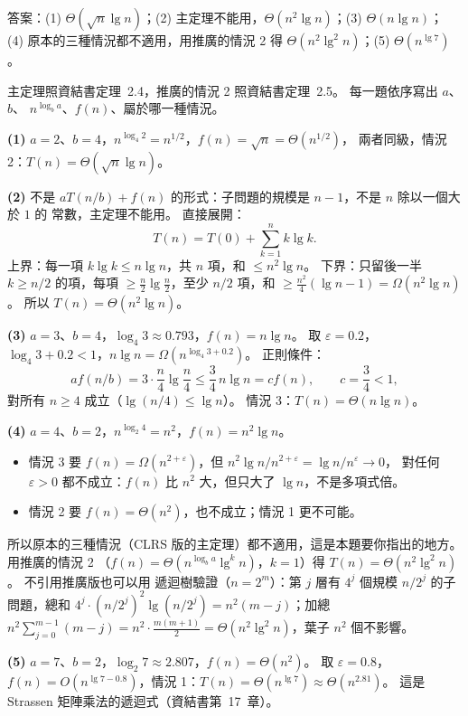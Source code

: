 \begin{pastsoln}
答案：(1) $\Theta(\sqrt{n} \lg n)$；(2) 主定理不能用，$\Theta(n^2 \lg n)$；(3) $\Theta(n \lg n)$；
(4) 原本的三種情況都不適用，用推廣的情況 2 得 $\Theta(n^2 \lg^2 n)$；(5) $\Theta(n^{\lg 7})$。

主定理照資結書定理~2.4，推廣的情況 2 照資結書定理~2.5。 每一題依序寫出 $a$、$b$、
$n^{\log_b a}$、$f(n)$、屬於哪一種情況。

\textbf{(1)} $a = 2$、$b = 4$，$n^{\log_4 2} = n^{1/2}$，$f(n) = \sqrt{n} = \Theta(n^{1/2})$，
兩者同級，情況 2：$T(n) = \Theta(\sqrt{n} \lg n)$。

\textbf{(2)} 不是 $aT(n/b) + f(n)$ 的形式：子問題的規模是 $n - 1$，不是 $n$ 除以一個大於 $1$ 的
常數，主定理不能用。 直接展開：
\[
T(n) = T(0) + \sum_{k=1}^{n} k \lg k .
\]
上界：每一項 $k \lg k \le n \lg n$，共 $n$ 項，和 $\le n^2 \lg n$。 下界：只留後一半
$k \ge n/2$ 的項，每項 $\ge \frac n2 \lg \frac n2$，至少 $n/2$ 項，和
$\ge \frac{n^2}{4}(\lg n - 1) = \Omega(n^2 \lg n)$。 所以 $T(n) = \Theta(n^2 \lg n)$。

\textbf{(3)} $a = 3$、$b = 4$，$\log_4 3 \approx 0.793$，$f(n) = n \lg n$。 取 $\varepsilon = 0.2$，
$\log_4 3 + 0.2 < 1$，$n \lg n = \Omega(n^{\log_4 3 + 0.2})$。 正則條件：
\[
a f(n/b) = 3 \cdot \frac n4 \lg \frac n4 \le \frac34\, n \lg n = c f(n), \qquad c = \frac34 < 1,
\]
對所有 $n \ge 4$ 成立（$\lg (n/4) \le \lg n$）。 情況 3：$T(n) = \Theta(n \lg n)$。

\textbf{(4)} $a = 4$、$b = 2$，$n^{\log_2 4} = n^2$，$f(n) = n^2 \lg n$。
\begin{itemize}
\item 情況 3 要 $f(n) = \Omega(n^{2 + \varepsilon})$，但 $n^2 \lg n / n^{2+\varepsilon} = \lg n / n^{\varepsilon} \to 0$，
對任何 $\varepsilon > 0$ 都不成立：$f(n)$ 比 $n^2$ 大，但只大了 $\lg n$，不是多項式倍。
\item 情況 2 要 $f(n) = \Theta(n^2)$，也不成立；情況 1 更不可能。
\end{itemize}
所以原本的三種情況（CLRS 版的主定理）都不適用，這是本題要你指出的地方。 用推廣的情況 2
（$f(n) = \Theta(n^{\log_b a} \lg^k n)$，$k = 1$）得 $T(n) = \Theta(n^2 \lg^2 n)$。 不引用推廣版也可以用
遞迴樹驗證（$n = 2^m$）：第 $j$ 層有 $4^j$ 個規模 $n/2^j$ 的子問題，總和
$4^j \cdot (n/2^j)^2 \lg(n/2^j) = n^2 (m - j)$；加總 $n^2 \sum_{j=0}^{m-1} (m - j) = n^2 \cdot
\frac{m(m+1)}{2} = \Theta(n^2 \lg^2 n)$，葉子 $n^2$ 個不影響。

\textbf{(5)} $a = 7$、$b = 2$，$\log_2 7 \approx 2.807$，$f(n) = \Theta(n^2)$。 取 $\varepsilon = 0.8$，
$f(n) = O(n^{\lg 7 - 0.8})$，情況 1：$T(n) = \Theta(n^{\lg 7}) \approx \Theta(n^{2.81})$。
這是 Strassen 矩陣乘法的遞迴式（資結書第~17~章）。
\end{pastsoln}
